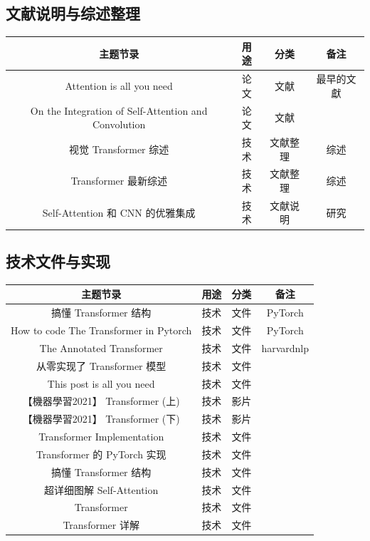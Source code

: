 \subsection{文献说明与综述整理}

\begin{center}
\begin{tabular}{cccc}
\hline
主题节录 & 用途 & 分类 & 备注  \\
\hline
Attention is all you need \cite{vaswani2017attention} & 论文 & 文献 & 最早的文獻 \\
On the Integration of Self-Attention and Convolution \cite{pan2021integration} & 论文 & 文献 &  \\
视觉 Transformer 综述 \cite{zhihutf23} & 技术 & 文献整理 & 综述 \\
Transformer 最新综述 \cite{jackcui24} & 技术 & 文献整理 & 综述 \\
Self-Attention 和 CNN 的优雅集成 \cite{mpweixinqq24} & 技术 & 文献说明 & 研究 \\
\hline
\end{tabular}
\end{center}

\subsection{技术文件与实现}

\begin{center}
\begin{tabular}{cccc}
\hline
主题节录 & 用途 & 分类 & 备注  \\
\hline
搞懂 Transformer 结构 \cite{zhihuscir} & 技术 & 文件 & PyTorch \\
How to code The Transformer in Pytorch \cite{tfmrsle} & 技术 & 文件 & PyTorch \\
The Annotated Transformer \cite{opennmt} & 技术 & 文件 & harvardnlp \\
从零实现了 Transformer 模型 \cite{zhihutf10} & 技术 & 文件 &  \\
This post is all you need \cite{zhihutf11} & 技术 & 文件 &  \\
【機器學習2021】 Transformer (上) \cite{hyltfr12} & 技术 & 影片 &  \\
【機器學習2021】 Transformer (下) \cite{hyltfr13} & 技术 & 影片 &  \\
Transformer Implementation \cite{deepaksaini16} & 技术 & 文件 &  \\
Transformer 的 PyTorch 实现 \cite{deeplnewer18} & 技术 & 文件 &  \\
搞懂 Transformer 结构 \cite{zhihutf19} & 技术 & 文件 &  \\
超详细图解 Self-Attention \cite{zhihutf20} & 技术 & 文件 &  \\
Transformer \cite{zhihutf21} & 技术 & 文件 &  \\
Transformer 详解 \cite{deeplnewer26} & 技术 & 文件 &  \\
\hline
\end{tabular}
\end{center}


